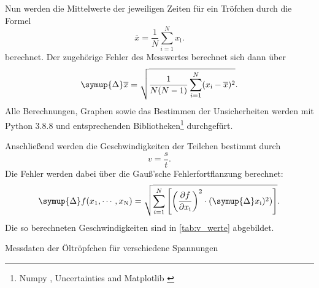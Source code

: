 Nun werden die Mittelwerte der jeweiligen Zeiten für ein Tröfchen durch die Formel
\begin{equation}
    \overline{x} = \frac{1}{N} \sum_{i=1}^{N} x_\text{i} .
    \label{eqn:mittel}
\end{equation}
berechnet. Der zugehörige Fehler des Messwertes berechnet sich dann über
\begin{equation}
    \symup{\Delta} \overline{x} = \sqrt{\frac{1}{N(N-1)} \sum_{i=1}^{N} (x_\text{i}-\overline{x})^2} .
    \label{eqn:std}
\end{equation}
Alle Berechnungen, Graphen sowie das Bestimmen der Unsicherheiten werden mit Python 3.8.8 und entsprechenden Bibliotheken\footnote{Numpy \cite{numpy}, Uncertainties \cite{uncertainties} and Matplotlib \cite{matplotlib}} durchgefürt.

Anschließend werden die Geschwindigkeiten der Teilchen bestimmt durch
\begin{equation*}
    v = \frac{s}{t}.
\end{equation*}
Die Fehler werden dabei über die Gauß'sche Fehlerfortflanzung berechnet:
\begin{equation}
    \symup{\Delta} f(x_1, \cdots, x_\text{N}) = \sqrt{\sum_{i=1}^{N} \left[ \left(\frac{\partial f}{\partial x_\text{i}}\right)^2 \cdot (\symup{\Delta} x_\text{i})^2) \right] } .
    \label{eqn:gaus}
\end{equation}
Die so berechneten Geschwindigkeiten sind in \autoref{tab:v_werte} abgebildet.

\begin{table}[H]
    \caption{Messdaten der Öltröpfchen für verschiedene Spannungen}
    \label{tab:v_werte}
    \centering
    \begin{minipage}[t]{0.45\textwidth}
        \small
        \label{stab:v175}
        
    \end{minipage}\qquad
    \begin{minipage}[t]{0.45\textwidth}
        \small
        \label{stab:v200}
        
    \end{minipage}\qquad
    \begin{minipage}[t]{0.45\textwidth}
        \small
        \label{stab:v225}
        
    \end{minipage}\qquad
    \begin{minipage}[t]{0.45\textwidth}
        \small
        \label{stab:v250}
        
    \end{minipage}\qquad
    \begin{minipage}[t]{0.45\textwidth}
        \small
        \label{stab:v275}
        
    \end{minipage}
\end{table}

